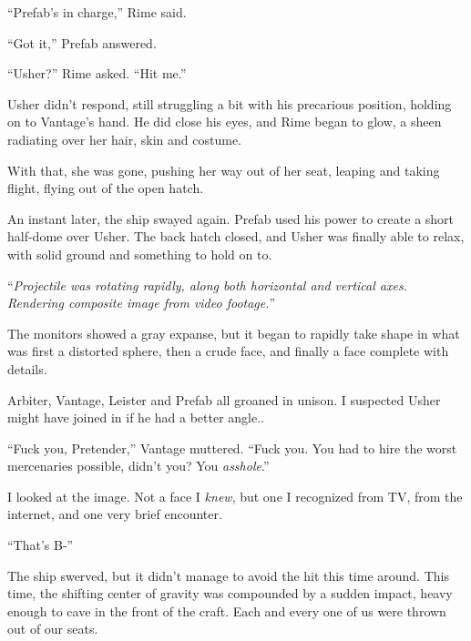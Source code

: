 ``Prefab's in charge,'' Rime said.



``Got it,'' Prefab answered.



``Usher?'' Rime asked.  ``Hit me.''



Usher didn't respond, still struggling a bit with his precarious position, holding on to Vantage's hand.  He did close his eyes, and Rime began to glow, a sheen radiating over her hair, skin and costume.



With that, she was gone, pushing her way out of her seat, leaping and taking flight, flying out of the open hatch.



An instant later, the ship swayed again.  Prefab used his power to create a short half-dome over Usher.  The back hatch closed, and Usher was finally able to relax, with solid ground and something to hold on to.



``\emph{Projectile was rotating rapidly, along both horizontal and vertical axes.  Rendering composite image from video footage.}''



The monitors showed a gray expanse, but it began to rapidly take shape in what was first a distorted sphere, then a crude face, and finally a face complete with details.



Arbiter, Vantage, Leister and Prefab all groaned in unison.  I suspected Usher might have joined in if he had a better angle..



``Fuck you, Pretender,'' Vantage muttered.  ``Fuck you.  You had to hire the worst mercenaries possible, didn't you?  You \emph{asshole}.''



I looked at the image.  Not a face I \emph{knew}, but one I recognized from TV, from the internet, and one very brief encounter.



``That's B-''



The ship swerved, but it didn't manage to avoid the hit this time around.  This time, the shifting center of gravity was compounded by a sudden impact, heavy enough to cave in the front of the craft.  Each and every one of us were thrown out of our seats.



